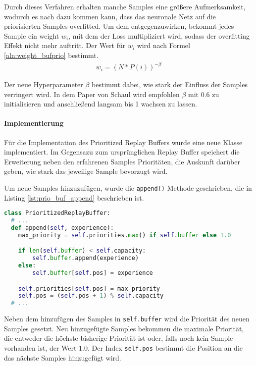\documentclass[11pt]{scrartcl}
\begin{document}
Durch dieses Verfahren erhalten manche Samples eine größere Aufmerksamkeit, wodurch es
nach \cite{schaul2015prioritized} dazu kommen kann, dass das neuronale Netz auf die
priorisierten Samples overfitted. Um dem entgegenzuwirken, bekommt jedes Sample ein
weight $w_i$, mit dem der Loss multipliziert wird, sodass der overfitting Effekt nicht
mehr auftritt. Der Wert für $w_i$ wird nach Formel \ref{aln:weight_bufprio} bestimmt.
\begin{align}
  w_i = \left(N * P(i)\right)^{-\beta}
\label{aln:weight_bufprio}
\end{align}

Der neue Hyperparameter $\beta$ bestimmt dabei, wie stark der Einfluss der Samples
verringert wird. In dem Paper von Schaul wird empfohlen $\beta$ mit 0.6 zu initialisieren
und anschließend langsam bis 1 wachsen zu lassen.

\paragraph*{Implementierung}
\noindent
\newline
Für die Implementation des Prioritized Replay Buffers wurde eine neue Klasse
implementiert. Im Gegensazu zum ursprünglichen Replay Buffer speichert die Erweiterung
neben den erfahrenen Samples Prioritäten, die Auskunft darüber geben, wie stark das
jeweilige Sample bevorzugt wird.

Um neue Samples hinzuzufügen, wurde die \lstinline!append()! Methode geschrieben, die in
Listing \ref{lst:prio_buf_append} beschrieben ist.
\begin{lstlisting}[language=Python, caption=append()-Funktion des PrioritizedReplayBuffers,
label=lst:prio_buf_append]
class PrioritizedReplayBuffer:
  # ...
  def append(self, experience):
    max_priority = self.priorities.max() if self.buffer else 1.0

    if len(self.buffer) < self.capacity:
        self.buffer.append(experience)
    else:
        self.buffer[self.pos] = experience

    self.priorities[self.pos] = max_priority
    self.pos = (self.pos + 1) % self.capacity
  # ...
\end{lstlisting}
\noindent
Neben dem hinzufügen des Samples in \lstinline!self.buffer! wird die Priorität des neuen
Samples gesetzt. Neu hinzugefügte Samples bekommen die maximale Priorität, die entweder
die höchste bisherige Priorität ist oder, falls noch kein Sample vorhanden ist, der Wert
$1.0$. Der Index \lstinline!self.pos! bestimmt die Position an die das nächste Samples
hinzugefügt wird.
\end{document}
